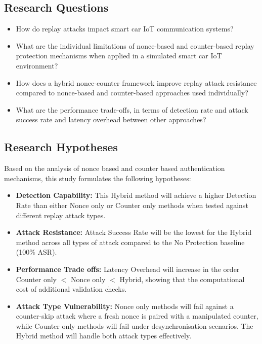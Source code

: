 \documentclass[a4paper,man,12pt]{article}
\begin{document}
\subsection{Research Questions}

\begin{itemize}
  \item How do replay attacks impact smart car IoT communication systems?
  \item What are the individual limitations of nonce-based and counter-based replay protection mechanisms when applied in a simulated smart car IoT environment?
  \item How does a hybrid nonce-counter framework improve replay attack resistance compared to nonce-based and counter-based approaches used individually?
  \item What are the performance trade-offs, in terms of detection rate and attack success rate and latency overhead between other approaches?
  
\end{itemize}

\subsection{Research Hypotheses}
\label{sec:hypotheses-ref}
Based on the analysis of nonce based and counter based authentication mechanisms, this study formulates the following hypotheses:

\begin{itemize}
    \item \textbf{Detection Capability:} This Hybrid method will achieve a higher Detection Rate than either Nonce only or Counter only methods when tested against different replay attack types.
    
    \item \textbf{Attack Resistance:} Attack Success Rate will be the lowest for the Hybrid method across all types of attack compared to the No Protection baseline (100\% ASR).
    
    \item \textbf{Performance Trade offs:} Latency Overhead will increase 
    in the order Counter only $<$ Nonce only $<$ Hybrid, showing that the computational cost of additional validation checks.
    
    \item \textbf{Attack Type Vulnerability:} Nonce only methods will fail against a counter-skip attack where a fresh nonce is paired with a manipulated counter, while Counter only methods will fail under desynchronisation scenarios. The Hybrid method will handle both attack types effectively.

\end{itemize}
\end{document}
